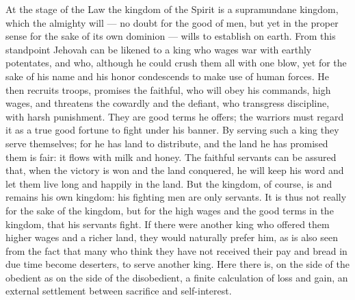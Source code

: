 \documentclass[12pt,a4paper,openany]{book}
\newcommand{\opage}[1]{\marginnote{\footnotesize\textit{[#1]}}}
\begin{document}
At the stage of the Law the kingdom of the Spirit is a supramundane
kingdom, which the almighty will --- no doubt for the good of men,
but yet in the proper sense for the sake of its
own dominion --- wills to establish on earth.
From this standpoint Jehovah can be likened to a king
who wages war with earthly potentates, and who, although
he could crush them all with one blow, yet
for the sake of his name and his honor condescends to
make use of human forces. He then recruits
troops, promises the faithful, who will obey his commands,
high wages, and threatens the cowardly and the defiant, who transgress
discipline, with harsh punishment. They are good terms
he offers; the warriors must regard it as a true
good fortune to fight under his banner. By serving such
a king they serve themselves; for he has land
to distribute, and the land he has promised them is fair:
it flows with milk and honey. The faithful servants
can be assured that, when the victory is
won and the land conquered, he will keep his word and let
them live long and happily in the land. But the kingdom,
of course, is and remains his own kingdom: his fighting men
are only servants. It is thus not really
for the sake of the kingdom, but for the high wages and the good
\setcounter{footnote}{0}%
\opage{60}terms in the kingdom, that his servants fight. If there were
another king who offered them higher wages and a
richer land, they would naturally prefer him, as is
also seen from the fact that many who think they have not
received their pay and bread in due time become deserters,
to serve another king. Here there is, on the side of
the obedient as on the side of the disobedient, a finite calculation
of loss and gain, an external settlement between
sacrifice and self-interest.
\end{document}
